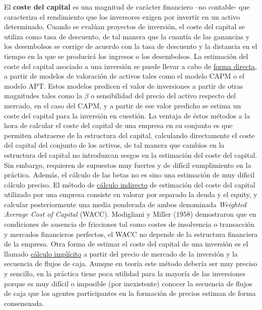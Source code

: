 \documentclass{nuevotema}
\begin{document}
El \textbf{coste del capital} es una magnitud de carácter financiero --no contable- que caracteriza el rendimiento que los inversores exigen por invertir en un activo determinado. Cuando se evalúan proyectos de inversión, el coste del capital se utiliza como tasa de descuento, de tal manera que la cuantía de las ganancias y los desembolsos se corrige de acuerdo con la tasa de descuento y la distancia en el tiempo en la que se producirá los ingresos o los desembolsos. La estimación del coste del capital asociado a una inversión se puede llevar a cabo de \underline{forma directa}, a partir de modelos de valoración de activos tales como el modelo CAPM o el modelo APT. Estos modelos predicen el valor de inversiones a partir de otras magnitudes tales como la $\beta$ o sensibilidad del precio del activo respecto del mercado, en el caso del CAPM, y a partir de ese valor predicho se estima un coste del capital para la inversión en cuestión. La ventaja de éstos métodos a la hora de calcular el coste del capital de una empresa en su conjunto es que permiten abstraerse de la estructura del capital, calculando directamente el coste del capital del conjunto de los activos, de tal manera que cambios en la estructura del capital no introduzcan sesgos en la estimación del coste del capital. Sin embargo, requieren de supuestos muy fuertes y de difícil cumplimiento en la práctica. Además, el cálculo de las betas no es sino una estimación de muy dificil cálculo preciso. El método de \underline{cálculo indirecto} de estimación del coste del capital utilizado por una empresa consiste en valorar por separado la deuda y el equity, y calcular posteriormente una media ponderada de ambos denominada \textit{Weighted Average Cost of Capital} (WACC). Modigliani y Miller (1958) demostraron que en condiciones de ausencia de fricciones tal como costes de insolvencia o transacción y mercados  financieros perfectos, el WACC no depende de la estructura financiera de la empresa. Otra forma de estimar el coste del capital de una inversión es el llamado \underline{cálculo implícito} a partir del precio de mercado de la inversión y la secuencia de flujos de caja. Aunque en teoría este método debería ser muy preciso y sencillo, en la práctica tiene poca utilidad para la mayoría de las inversiones porque es muy difícil o imposible (por inexistente) conocer la secuencia de flujos de caja que los agentes participantes en la formación de precios estiman de forma consensuada. 
\end{document}
